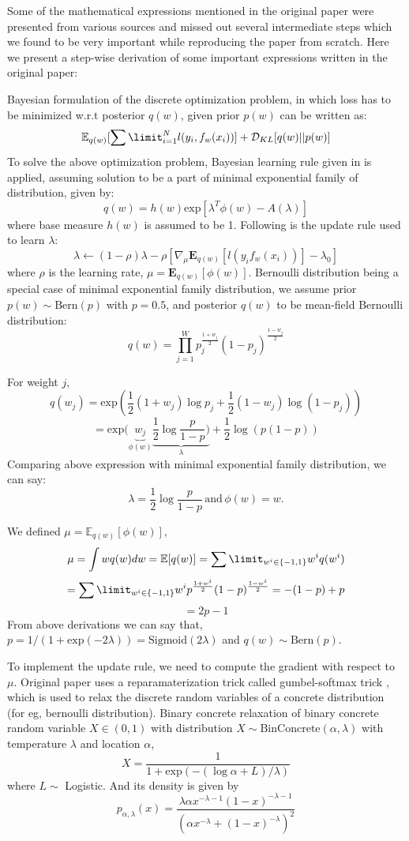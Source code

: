 Some of the mathematical expressions mentioned in the original paper were presented from various sources and missed out several intermediate steps which we found to be very important while reproducing the paper from scratch. Here we present a step-wise derivation of some important expressions written in the original paper: 

Bayesian formulation of the discrete optimization problem, in which loss has to be minimized w.r.t posterior $q(w)$, given prior $p(w)$ can be written as: 
\[\mathbb{E}_{q(w)} [\sum\limit_{i=1}^{N}l(y_{i}, f_{w}(x_{i}))] + \mathcal{D}_{KL}[q(w)||p(w)]\]
To solve the above optimization problem, Bayesian learning rule given in \cite{r6} is applied, assuming solution to be a part of minimal exponential family of distribution, given by: \[q(w) = h(w)\text{exp}[\lambda^{T}\phi(w) - A(\lambda)]\]  
where base measure $h(w)$ is assumed to be 1. Following is the update rule used to learn $\lambda$: \[\lambda \leftarrow (1-\rho)\lambda - \rho[\nabla_{\mu}\mathbf{E}_{q(w)}[l(y_{i} f_{w}(x_{i}))]-\lambda_{0}]\] where $\rho$ is the learning rate, $\mu = \mathbf{E}_{q(w)}[\phi(w)]$. Bernoulli distribution being a special case of minimal exponential family distribution, we assume prior $p(w) \sim \mathrm{Bern}(p)$ with $p = 0.5$, and posterior $q(w)$ to be mean-field Bernoulli distribution: \[q(w) = \prod_{j=1}^W p_{j}^{\frac{1+w_{j}}{2}}(1-p_{j})^{\frac{1-w_{j}}{2}} \]   

For weight $j$, \[q(w_j) = \mathrm{exp}(\frac{1}{2}(1+w_j)\log p_j + \frac{1}{2}(1-w_j)\log(1-p_j))\] \[ = \mathrm{exp}(\underbrace{w_j}_{\phi(w)}\underbrace{\frac{1}{2}\log\frac{p}{1-p})}_{\lambda} + \frac{1}{2}\log(p(1-p))\]
Comparing above expression with minimal exponential family distribution, we can say:
\[\lambda = \frac{1}{2}\log\frac{p}{1-p} \, \mathrm{and} \, \phi(w) = w.\]

We defined $\mu = \mathbb{E}_{q(w)}[\phi(w)]$,
\[\mu = \int wq(w)dw = \mathbb{E}[q(w)] = \sum\limit_{w^{i}\in\{-1,1\}}w^{i} q(w^{i}) \] \[= \sum\limit_{w^{i}\in\{-1,1\}}w^{i} p^{\frac{1+w^{i}}{2}}(1-p)^{\frac{1-w^{i}}{2}} = -(1-p) + p\]
\[= 2p-1\]
From above derivations we can say that, $p = 1/(1 + \mathrm{exp}(-2\lambda)) = \mathrm{Sigmoid}(2\lambda)$ and $q(w) \sim \mathrm{Bern}(p)$.

To implement the update rule, we need to compute the gradient with respect to $\mu$. Original paper uses a reparamaterization trick called  gumbel-softmax trick \cite{r7}, which is used to relax the discrete random variables of a concrete distribution (for eg, bernoulli distribution).  Binary concrete relaxation \cite{r7} of binary concrete random variable $X \in (0,1)$ with distribution $X \sim \mathrm{BinConcrete}(\alpha, \lambda)$ with temperature $\lambda$ and location $\alpha $, \[X = \frac{1}{1 + \mathrm{exp}(-(\log\alpha + L)/\lambda)}\] where $L \sim $ Logistic. And its density is given by \[p_{\alpha,\lambda}(x) = \frac{\lambda\alpha x^{-\lambda-1}(1-x)^{-\lambda-1}}{(\alpha x^{-\lambda} + (1-x)^{-\lambda})^{2}}\]


